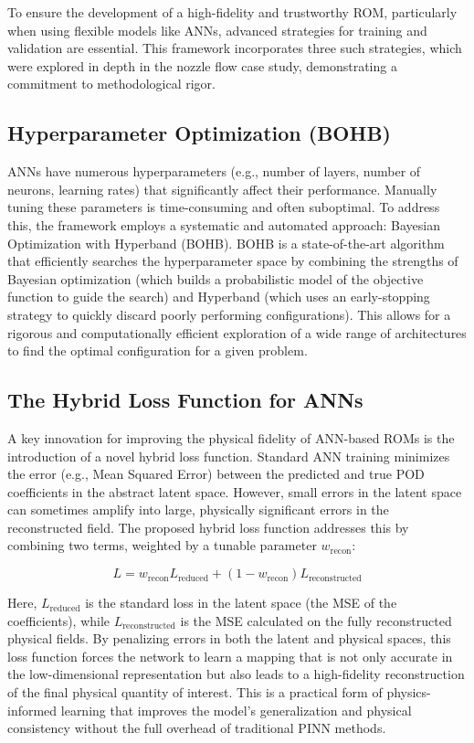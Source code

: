 \documentclass[dsc, EN]{ufabcFHZh}
\begin{document}
To ensure the development of a high-fidelity and trustworthy ROM, particularly when using flexible models like ANNs, advanced strategies for training and validation are essential. This framework incorporates three such strategies, which were explored in depth in the nozzle flow case study, demonstrating a commitment to methodological rigor.

\subsection{Hyperparameter Optimization (BOHB)}


ANNs have numerous hyperparameters (e.g., number of layers, number of neurons, learning rates) that significantly affect their performance. Manually tuning these parameters is time-consuming and often suboptimal. To address this, the framework employs a systematic and automated approach: Bayesian Optimization with Hyperband (BOHB). BOHB is a state-of-the-art algorithm that efficiently searches the hyperparameter space by combining the strengths of Bayesian optimization (which builds a probabilistic model of the objective function to guide the search) and Hyperband (which uses an early-stopping strategy to quickly discard poorly performing configurations). This allows for a rigorous and computationally efficient exploration of a wide range of architectures to find the optimal configuration for a given problem.


\subsection{ The Hybrid Loss Function for ANNs}

A key innovation for improving the physical fidelity of ANN-based ROMs is the introduction of a novel hybrid loss function. Standard ANN training minimizes the error (e.g., Mean Squared Error) between the predicted and true POD coefficients in the abstract latent space. However, small errors in the latent space can sometimes amplify into large, physically significant errors in the reconstructed field. The proposed hybrid loss function addresses this by combining two terms, weighted by a tunable parameter $w_{\text{recon}}$:


$$L = w_{\text{recon}} L_{\text{reduced}} + (1 - w_{\text{recon}}) L_{\text{reconstructed}}$$

Here, $L_{\text{reduced}}$ is the standard loss in the latent space (the MSE of the coefficients), while $L_{\text{reconstructed}}$ is the MSE calculated on the fully reconstructed physical fields. By penalizing errors in both the latent and physical spaces, this loss function forces the network to learn a mapping that is not only accurate in the low-dimensional representation but also leads to a high-fidelity reconstruction of the final physical quantity of interest. This is a practical form of physics-informed learning that improves the model's generalization and physical consistency without the full overhead of traditional PINN methods.
\end{document}
